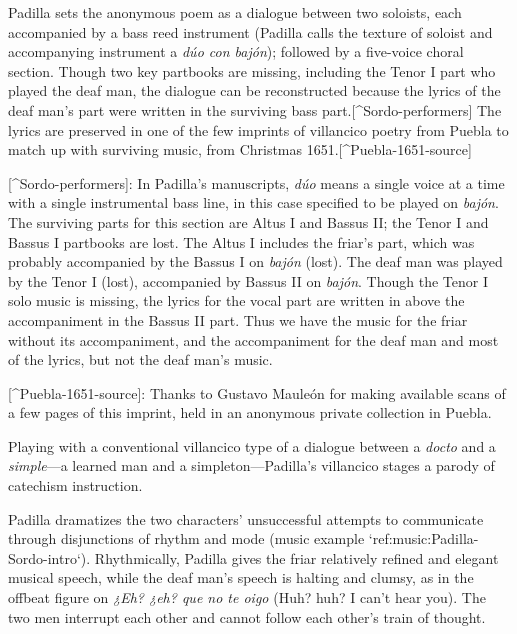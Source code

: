 \label{poem:Oyeme_Toribio-Padilla}

Padilla sets the anonymous poem as a dialogue between two soloists, each accompanied by a bass reed instrument (Padilla calls the texture of soloist and accompanying instrument a \emph{dúo con bajón}); followed by a five-voice choral section.
Though two key partbooks are missing, including the Tenor I part who played the deaf man, the dialogue can be reconstructed because the lyrics of the deaf man's part were written in the surviving bass part.[^Sordo-performers]
The lyrics are preserved in one of the few imprints of villancico poetry from Puebla to match up with surviving music, from Christmas 1651.[^Puebla-1651-source]

[^Sordo-performers]:  In Padilla's manuscripts, \emph{dúo} means a single voice at a time with a single instrumental bass line, in this case specified to be played on \emph{bajón}.
The surviving parts for this section are Altus I and Bassus II; the Tenor I and Bassus I partbooks are lost.
The Altus I includes the friar's part, which was probably accompanied by the Bassus I on \emph{bajón} (lost).
The deaf man was played by the Tenor I (lost), accompanied by Bassus II on \emph{bajón}.
Though the Tenor I solo music is missing, the lyrics for the vocal part are written in above the accompaniment in the Bassus II part.
Thus we have the music for the friar without its accompaniment, and the accompaniment for the deaf man and most of the lyrics, but not the deaf man's music.

[^Puebla-1651-source]: Thanks to Gustavo Mauleón for making available scans of a few pages of this imprint, held in an anonymous private collection in Puebla.


Playing with a conventional villancico type of a dialogue between a \emph{docto} and a \emph{simple}---a learned man and a simpleton---Padilla's villancico stages a parody of catechism instruction.

Padilla dramatizes the two characters' unsuccessful attempts to communicate through disjunctions of rhythm and mode  (music example `ref:music:Padilla-Sordo-intro`).
Rhythmically, Padilla gives the friar relatively refined and elegant musical speech, while the deaf man's speech is halting and clumsy, as in the offbeat figure on \emph{¿Eh? ¿eh? que no te oigo} (Huh? huh? I can't hear you).
The two men interrupt each other and cannot follow each other's train of thought.


